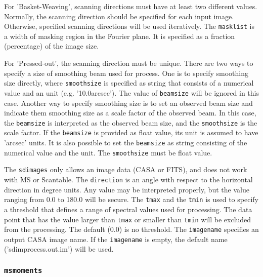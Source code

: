         For 'Basket-Weaving', scanning directions must have at least two 
        different values. Normally, the scanning direction should be 
        specified for each input image. Otherwise, specified scanning 
        directions will be used iteratively. The {\tt masklist} is a width of 
        masking region in the Fourier plane. It is specified as a fraction 
        (percentage) of the image size. 

        For 'Pressed-out', the scanning direction must be unique. There are 
        two ways to specify a size of smoothing beam used for process. One 
        is to specify smoothing size directly, where {\tt smoothsize} is specified
        as string that consists of a numerical value and an unit 
        (e.g. '10.0arcsec'). The value of {\tt beamsize} will be ignored in this case. 
        Another way to specify smoothing size is to set an observed beam size 
        and indicate them smoothing size as a scale factor of the observed beam.
        In this case, the {\tt beamsize} is interpreted as the observed beam 
        size, and the {\tt smoothsize} is the scale factor. If the {\tt beamsize} is 
        provided as float value, its unit is assumed to have 'arcsec' units. It is also 
        possible to set the {\tt beamsize} as string consisting of the numerical 
        value and the unit. The {\tt smoothsize} must be float value.

        The {\tt sdimages} only allows an image data (CASA or FITS), and does
        not work with MS or Scantable. The {\tt direction} is an angle with respect 
        to the horizontal direction in degree units. Any value may be 
        interpreted properly, but the value ranging from 0.0 to 180.0 will be 
        secure. The {\tt tmax} and the {\tt tmin} is used to specify a threshold that 
        defines a range of spectral values used for processing. The data point 
        that has the value larger than {\tt tmax} or smaller than {\tt tmin} will be 
        excluded from the processing. The default (0.0) is no threshold. 
        The {\tt imagename} specifies an output CASA image name. If the {\tt imagename} 
        is empty, the default name ('sdimprocess.out.im') will be used. 


\subsubsection{{\tt msmoments}}
\label{section:sd.sdtasks.tasks.sdmoments}

